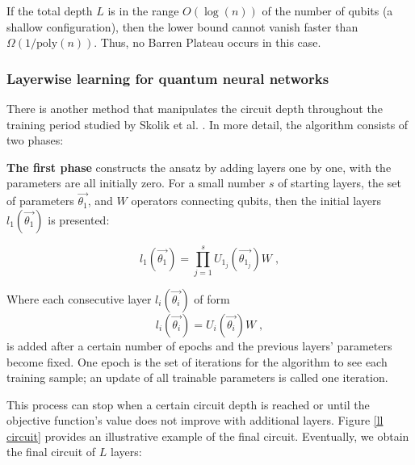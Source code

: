 If the total depth $L$ is in the range $O(\log(n))$ of the number of qubits (a shallow configuration), then the lower bound cannot vanish faster than $\Omega(1/\mathrm{poly}(n))$. 
Thus, no Barren Plateau occurs in this case.



\subsubsection{Layerwise learning for quantum neural networks}

There is another method that manipulates the circuit depth throughout the training period studied by Skolik et al. \cite{skolikLayerwiseLearningQuantum2021}. 
In more detail, the algorithm consists of two phases:

\textbf{The first phase} constructs the ansatz by adding layers one by one, with the parameters are all initially zero. For a small number $s$ of starting layers, the set of parameters $\vec{\theta_1}$, and $W$ operators connecting qubits, then the initial layers $l_1(\vec{\theta_1})$ is presented:

\begin{equation}
    l_1(\vec{\theta_1})
    = \prod_{j=1}^s U_{1_j}(\vec{\theta_{1_j}}) W \;,
\end{equation}

Where each consecutive layer $l_i(\vec{\theta_i})$ of form
\begin{equation}
    l_i(\vec{\theta_i})
    =U_i(\vec{\theta_i}) W \;,
\end{equation}
is added after a certain number of epochs and the previous layers' parameters become fixed. 
One epoch is the set of iterations for the algorithm to see each training sample; an update of all trainable parameters is called one iteration.

This process can stop when a certain circuit depth is reached or until the objective function's value does not improve with additional layers.
Figure \ref{ll circuit} provides an illustrative example of the final circuit.
Eventually, we obtain the final circuit of $L$ layers:

